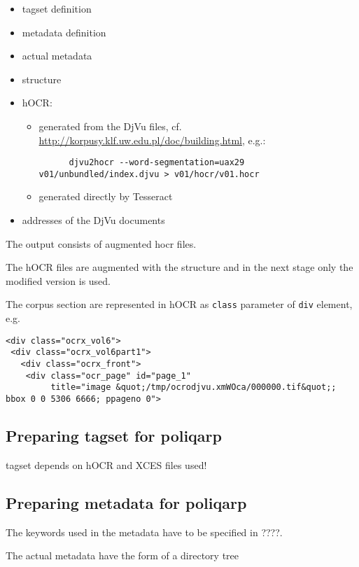 \documentclass{article}
\begin{document}
\begin{itemize}
\item tagset definition
\item metadata definition
\item actual metadata
\item structure
\item hOCR:
  \begin{itemize}
  \item generated from the DjVu files,
    cf. \url{http://korpusy.klf.uw.edu.pl/doc/building.html}, e.g.:
    {
    \begin{verbatim}
      djvu2hocr --word-segmentation=uax29 v01/unbundled/index.djvu > v01/hocr/v01.hocr
    \end{verbatim}}
  \item generated directly by Tesseract
  \end{itemize}
\item addresses of the DjVu documents 
\end{itemize}

The output consists of augmented hocr files.

The hOCR files are augmented with the structure and in the next stage
only the modified version is used.

The corpus section are represented in hOCR as \texttt{class} parameter
of \texttt{div} element, e.g.

\begin{verbatim}
<div class="ocrx_vol6">
 <div class="ocrx_vol6part1">
   <div class="ocrx_front">
    <div class="ocr_page" id="page_1" 
         title="image &quot;/tmp/ocrodjvu.xmWOca/000000.tif&quot;; bbox 0 0 5306 6666; ppageno 0">
\end{verbatim}

\subsection{Preparing tagset for poliqarp}
\label{sec:prep-tags-poliq}

tagset depends on hOCR and XCES files used!


\subsection{Preparing metadata for poliqarp}
\label{sec:preparing-matadata}

The keywords used in the metadata have to be specified in ????.

The actual metadata have the form of a directory tree
\end{document}

